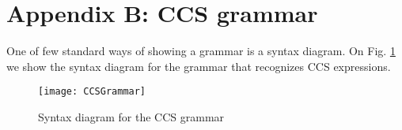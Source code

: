 \section*{Appendix B: CCS grammar}
One of few standard ways of showing a grammar is a syntax diagram. On Fig. \ref{fig:CCSGrammar} we show the syntax diagram
for the grammar that recognizes CCS expressions.

\begin{figure}
\centering
\texttt{[image: CCSGrammar]}
\caption{Syntax diagram for the CCS grammar}
\label{fig:CCSGrammar}
\end{figure}